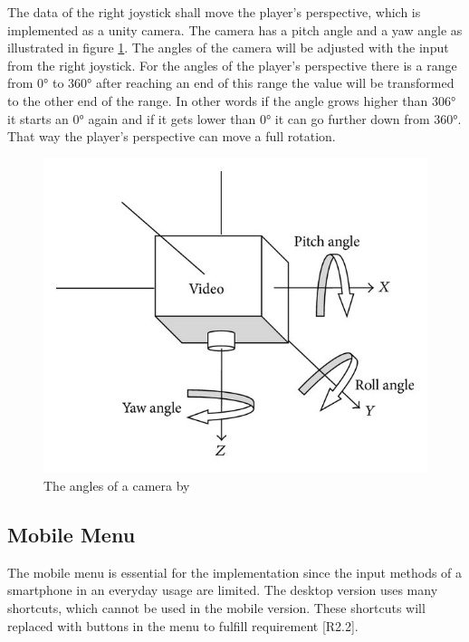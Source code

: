The data of the right joystick shall move the player's perspective, which is implemented as a \gls{unity} camera.
The camera has a pitch angle and a yaw angle as illustrated in figure \ref{fig:camera}.
The angles of the camera will be adjusted with the input from the right joystick. 
For the angles of the player's perspective there is a range from 0° to 360° after reaching an end of this range the value will be transformed to the other end of the range.
In other words if the angle grows higher than 306° it starts an 0° again and if it gets lower than 0° it can go further down from 360°.
That way the player's perspective can move a full rotation.
\begin{figure}[htb]
    \centering
    \includegraphics[width=1\textwidth]{Implementation/img/pitch_yaw.jpg}
    \caption{The angles of a camera by \cite{Zhang2014}}\label{fig:camera}
\end{figure}

\subsection{Mobile Menu}
\label{sec:menu}

The mobile menu is essential for the implementation since the input methods of a smartphone in an everyday usage are limited.
The desktop version uses many \glspl{shortcut}, which cannot be used in the mobile version.
These \glspl{shortcut} will replaced with buttons in the menu to fulfill requirement [R2.2].

